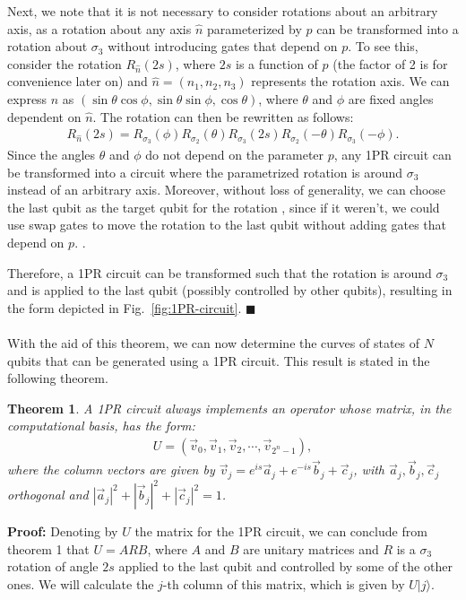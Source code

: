 \documentclass[10pt,letterpaper]{article} %
\newcommand{\fref}[1]{Fig.~\ref{#1}}
\newtheorem{theorem}{Theorem}
\begin{document}
Next, we note that it is not necessary to consider rotations about an arbitrary axis,
as a rotation about any axis $\hat{n}$ parameterized by $p$
can be transformed into a rotation about $\sigma_3$ without introducing 
gates that depend on $p$. To see this, consider the rotation $R_{\hat{n}}(2s)$, where $2s$ 
is a function of $p$ (the factor of 2 is for convenience later on) 
and $\hat{n} = (n_1,n_2,n_3)$ represents the rotation axis. 
We can express $\hat{n}$ as $(\sin \theta \cos \phi, \sin \theta \sin \phi, \cos \theta)$, 
where $\theta$ and $\phi$ are fixed angles dependent on $\hat{n}$. 
The rotation can then be rewritten as follows:
\begin{eqnarray}
R_{\hat{n}}(2s) = R_{\sigma_3}(\phi) R_{\sigma_2}(\theta) R_{\sigma_3}(2s) R_{\sigma_2}(-\theta) R_{\sigma_3}(-\phi).
\end{eqnarray}
Since the angles $\theta$ and $\phi$ do not depend on the parameter $p$,
any 1PR circuit can be transformed into a circuit where the parametrized
 rotation is around $\sigma_3$ instead of an arbitrary axis. 
Moreover, without loss of generality, we can choose the last qubit as the
target qubit for the rotation  
{\color{orange} , since if it weren't, we could use
swap gates to move the rotation
to the last qubit without adding gates
that depend on $p$. }.

Therefore, a 1PR circuit can be transformed such
that the rotation is around $\sigma_3$ and is applied to the last qubit 
(possibly controlled by other qubits), 
resulting in the form depicted in \fref{fig:1PR-circuit}. 
 
$\blacksquare$ \\
$\;$\\

With the aid of this theorem, we can now determine the curves
of states of $N$ qubits that can be generated using a 1PR circuit. 
This result is stated in the following theorem.

\begin{theorem}
A 1PR circuit always implements an operator whose matrix,
in the computational basis, has the form:
\begin{eqnarray}
U = (\vec{v}_0, \vec{v}_1, \vec{v}_2, \cdots, \vec{v}_{2^n-1}),
\end{eqnarray}
where the column vectors are given by $\vec{v}_j = e^{is} \vec{a}_j + e^{-is} \vec{b}_j + \vec{c}_j$,
with $\vec{a}_j ,\vec{b}_j, \vec{c}_j$ orthogonal and $|\vec{a}_j|^2 + |\vec{b}_j|^2 + |\vec{c}_j|^2 = 1$.
\end{theorem}
\textbf{Proof:} 
Denoting by $U$ the matrix for the 1PR circuit,
we can conclude from theorem 1 that $U=ARB$,
where $A$ and $B$ are unitary matrices and $R$ is a $\sigma_3$ rotation of angle $2s$
applied to the last qubit and controlled by some of the other
ones. 
We will calculate the $j$-th column of this matrix,
which is given by $U|j\rangle$.
\end{document}
